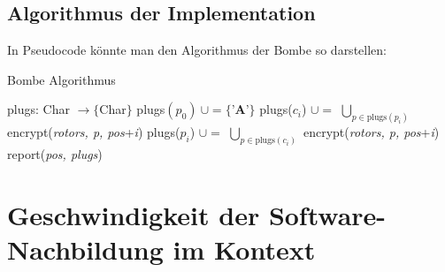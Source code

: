\section{Algorithmus der Implementation}\label{sec:algorithm_bombe}
In Pseudocode könnte man den Algorithmus der Bombe so darstellen:
\begin{algorithm}[htbp]
	\caption{Bombe Algorithmus}
	\begin{algorithmic}
			\State plugs: Char $\rightarrow \{ $Char$\}$
			\State plugs$(p_0)\ \cup= \{\textbf{'A'}\}$
			\State plugs($c_i$) $\cup=$ $\bigcup_{p \in \text{plugs}(p_i)}$ encrypt(\textsl{rotors, p, pos}+\textsl{i})
			\State plugs($p_i$) $\cup=$ $\bigcup_{p \in \text{plugs}(c_i)}$ encrypt(\textsl{rotors, p, pos}+\textsl{i})
			\EndFor
			\EndWhile
			\State report(\textsl{pos, plugs})
			\EndIf
			\EndFor
			\EndProcedure
		\end{algorithmic}
	\label{alg:algorithm}
\end{algorithm}



\chapter{Geschwindigkeit der Software-Nachbildung im Kontext}\label{ch:speed}